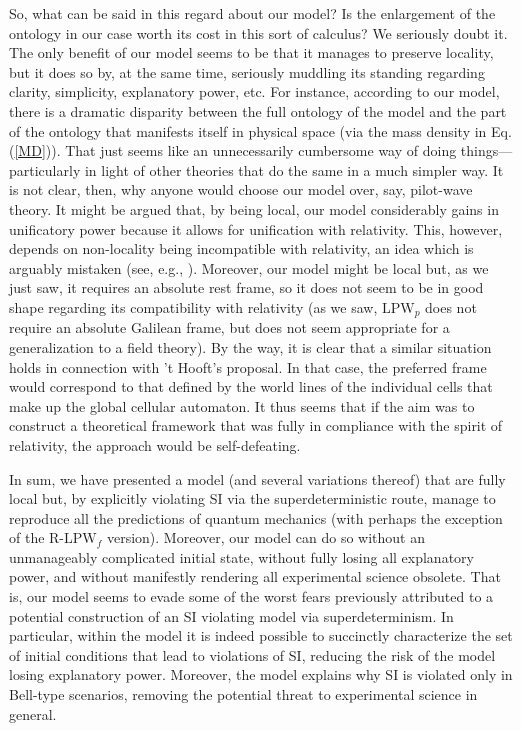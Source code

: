 \documentclass[letterpaper,12pt]{article}
\begin{document}
So, what can be said in this regard about our model? Is the enlargement of the ontology in our case worth its cost in this sort of calculus? We seriously doubt it. The only benefit of our model seems to be that it manages to preserve locality, but it does so by, at the same time, seriously muddling its standing regarding clarity, simplicity, explanatory power, etc. For instance, according to our model, there is a dramatic disparity between the full ontology of the model and the part of the ontology that manifests itself in physical space (via the mass density in Eq. (\ref{MD})). That just seems like an unnecessarily cumbersome way of doing things---particularly in light of other theories that do the same in a much simpler way. It is not clear, then, why anyone would choose our model over, say, pilot-wave theory. It might be argued that, by being local, our model considerably gains in unificatory power because it allows for unification with relativity. This, however, depends on non-locality being incompatible with relativity, an idea which is arguably mistaken (see, e.g., \cite{Maudlin}). Moreover, our model might be local but, as we just saw, it requires an absolute rest frame, so it does not seem to be in good shape regarding its compatibility with relativity (as we saw, $\text{LPW}_p$ does not require an absolute Galilean frame, but does not seem appropriate for a generalization to a field theory). By the way, it is clear that a similar situation holds in connection with 't Hooft's proposal. In that case, the preferred frame would correspond to that defined by the world lines of the individual cells that make up the global cellular automaton. It thus seems that if the aim was to construct a theoretical framework that was fully in compliance with the spirit of relativity, the approach would be self-defeating.

In sum, we have presented a model (and several variations thereof) that are fully local but, by explicitly violating SI via the superdeterministic route, manage to reproduce all the predictions of quantum mechanics (with perhaps the exception of the $\text{R-LPW}_f$ version). Moreover, our model can do so without an unmanageably complicated initial state, without fully losing all explanatory power, and without manifestly rendering all experimental science obsolete. That is, our model seems to evade some of the worst fears previously attributed to a potential construction of an SI violating model via superdeterminism. In particular, within the model it is indeed possible to succinctly characterize the set of initial conditions that lead to violations of SI, reducing the risk of the model losing explanatory power. Moreover, the model explains why SI is violated only in Bell-type scenarios, removing the potential threat to experimental science in general.
\end{document}
